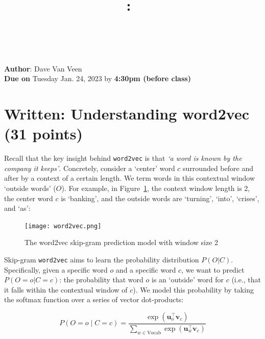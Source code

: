 \documentclass{article}
\title{
\vspace{-1in}
\textmd{\textbf{\hmwkClass:\ \hmwkTitle} \\ \hmwkAuthorName}\\
}
\author{}
\date{}
\begin{document}
\maketitle
\vspace{-.7in}

\begin{center}
    \large{\textbf{Author}: Dave Van Veen} \\
    \large{\textbf{Due on} Tuesday Jan. 24, 2023 by \textbf{4:30pm (before class)}}
\end{center}

\section{Written: Understanding word2vec (31 points)}
Recall that the key insight behind {\tt word2vec} is that \textit{`a word is known by the company it keeps'}. Concretely, consider a `center' word $c$ surrounded before and after by a context of a certain length. We term words in this contextual window `outside words' ($O$). For example, in Figure~\ref{fig:word2vec}, the context window length is 2, the center word $c$ is `banking', and the outside words are `turning', `into', `crises', and `as':

\begin{figure}[h]
    \centering
    \texttt{[image: word2vec.png]}
    \caption{The word2vec skip-gram prediction model with window size 2}
    \label{fig:word2vec}
\end{figure}

Skip-gram {\tt word2vec} aims to learn the probability distribution $P(O|C)$. 
Specifically, given a specific word $o$ and a specific word $c$, we want to predict $P(O=o|C=c)$: the probability that word $o$ is an `outside' word for $c$ (i.e., that it falls within the contextual window of $c$).
We model this probability by taking the softmax function over a series of vector dot-products: %

\begin{equation}
 P(O=o \mid C=c) = \frac{\exp(\bm u_{o}^\top \bm v_c)}{\sum_{w \in \text{Vocab}} \exp(\bm u_{w}^\top \bm v_c)}
 \label{word2vec_condprob}
\end{equation}
\end{document}
